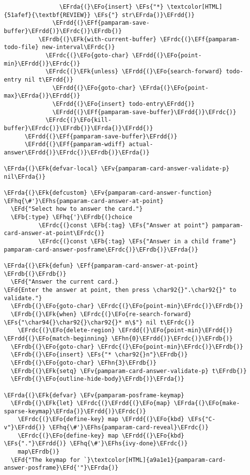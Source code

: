 \documentclass[a4wide,10pt]{article}
\newcommand{\EFs}[1]{\textcolor{EFs}{#1}} %
\newcommand{\EFd}[1]{\textcolor{EFd}{#1}} %
\newcommand{\EFk}[1]{\textcolor{EFk}{#1}} %
\newcommand{\EFb}[1]{\textcolor{EFb}{#1}} %
\newcommand{\EFf}[1]{\textcolor{EFf}{#1}} %
\newcommand{\EFv}[1]{\textcolor{EFv}{#1}} %
\newcommand{\EFo}[1]{\textcolor{EFo}{#1}} %
\newcommand{\EFhn}[1]{\textcolor{EFhn}{\textbf{#1}}} %
\newcommand{\EFhq}[1]{\textcolor{EFhq}{#1}} %
\newcommand{\EFhs}[1]{\textcolor{EFhs}{#1}} %
\newcommand{\EFrda}[1]{\textcolor{EFrda}{#1}} %
\newcommand{\EFrdb}[1]{\textcolor{EFrdb}{#1}} %
\newcommand{\EFrdc}[1]{\textcolor{EFrdc}{#1}} %
\newcommand{\EFrdd}[1]{\textcolor{EFrdd}{#1}} %
\begin{document}
\begin{Code}
\begin{Verbatim}
                \EFrda{(}\EFo{insert} \EFs{"*} \textcolor[HTML]{51afef}{\textbf{REVIEW}} \EFs{"} str\EFrda{)}\EFrdd{)}
              \EFrdd{(}\EFf{pamparam-save-buffer}\EFrdd{)}\EFrdc{)}\EFrdb{)}
          \EFrdb{(}\EFk{with-current-buffer} \EFrdc{(}\EFf{pamparam-todo-file} new-interval\EFrdc{)}
            \EFrdc{(}\EFo{goto-char} \EFrdd{(}\EFo{point-min}\EFrdd{)}\EFrdc{)}
            \EFrdc{(}\EFk{unless} \EFrdd{(}\EFo{search-forward} todo-entry nil t\EFrdd{)}
              \EFrdd{(}\EFo{goto-char} \EFrda{(}\EFo{point-max}\EFrda{)}\EFrdd{)}
              \EFrdd{(}\EFo{insert} todo-entry\EFrdd{)}
              \EFrdd{(}\EFf{pamparam-save-buffer}\EFrdd{)}\EFrdc{)}
            \EFrdc{(}\EFo{kill-buffer}\EFrdc{)}\EFrdb{)}\EFrda{)}\EFrdd{)}
      \EFrdd{(}\EFf{pamparam-save-buffer}\EFrdd{)}
      \EFrdd{(}\EFf{pamparam-wdiff} actual-answer\EFrdd{)}\EFrdc{)}\EFrdb{)}\EFrda{)}

\EFrda{(}\EFk{defvar-local} \EFv{pamparam-card-answer-validate-p} nil\EFrda{)}

\EFrda{(}\EFk{defcustom} \EFv{pamparam-card-answer-function} \EFhq{\#'}\EFhs{pamparam-card-answer-at-point}
  \EFd{"Select how to answer the card."}
  \EFb{:type} \EFhq{'}\EFrdb{(}choice
          \EFrdc{(}const \EFb{:tag} \EFs{"Answer at point"} pamparam-card-answer-at-point\EFrdc{)}
          \EFrdc{(}const \EFb{:tag} \EFs{"Answer in a child frame"} pamparam-card-answer-posframe\EFrdc{)}\EFrdb{)}\EFrda{)}

\EFrda{(}\EFk{defun} \EFf{pamparam-card-answer-at-point} \EFrdb{(}\EFrdb{)}
  \EFd{"Answer the current card.}
\EFd{Enter the answer at point, then press \char92{}".\char92{}" to validate."}
  \EFrdb{(}\EFo{goto-char} \EFrdc{(}\EFo{point-min}\EFrdc{)}\EFrdb{)}
  \EFrdb{(}\EFk{when} \EFrdc{(}\EFo{re-search-forward} \EFs{"\char94{}\char92{}\char92{}* m\$"} nil t\EFrdc{)}
    \EFrdc{(}\EFo{delete-region} \EFrdd{(}\EFo{point-min}\EFrdd{)} \EFrdd{(}\EFo{match-beginning} \EFhn{0}\EFrdd{)}\EFrdc{)}\EFrdb{)}
  \EFrdb{(}\EFo{goto-char} \EFrdc{(}\EFo{point-min}\EFrdc{)}\EFrdb{)}
  \EFrdb{(}\EFo{insert} \EFs{"* \char92{}n"}\EFrdb{)}
  \EFrdb{(}\EFo{goto-char} \EFhn{3}\EFrdb{)}
  \EFrdb{(}\EFk{setq} \EFv{pamparam-card-answer-validate-p} t\EFrdb{)}
  \EFrdb{(}\EFo{outline-hide-body}\EFrdb{)}\EFrda{)}

\EFrda{(}\EFk{defvar} \EFv{pamparam-posframe-keymap}
  \EFrdb{(}\EFk{let} \EFrdc{(}\EFrdd{(}\EFo{map} \EFrda{(}\EFo{make-sparse-keymap}\EFrda{)}\EFrdd{)}\EFrdc{)}
    \EFrdc{(}\EFo{define-key} map \EFrdd{(}\EFo{kbd} \EFs{"C-v"}\EFrdd{)} \EFhq{\#'}\EFhs{pamparam-card-reveal}\EFrdc{)}
    \EFrdc{(}\EFo{define-key} map \EFrdd{(}\EFo{kbd} \EFs{"."}\EFrdd{)} \EFhq{\#'}\EFhs{ivy-done}\EFrdc{)}
    map\EFrdb{)}
  \EFd{"The keymap for `}\textcolor[HTML]{a9a1e1}{pamparam-card-answer-posframe}\EFd{'"}\EFrda{)}


\end{Verbatim}
\end{Code}
\end{document}
